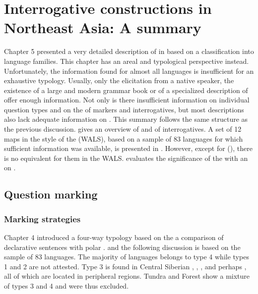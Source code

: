 \chapter{Interrogative constructions in Northeast Asia: A summary}\label{sec:6}

Chapter 5 presented a very detailed description of  in  based on a classification into language families. This chapter has an areal and typological perspective instead. Unfortunately, the information found for almost all languages is insufficient for an exhaustive typology. Usually, only the elicitation from a native speaker, the existence of a large and modern grammar book or of a specialized description of  offer enough information. Not only is there insufficient information on individual question types and on the  of markers and interrogatives, but most descriptions also lack adequate information on . This summary follows the same structure as the previous discussion.  gives an overview of  and  of interrogatives. A set of 12 maps in the style of the \textit{} (WALS), based on a sample of 83 languages for which sufficient information was available, is presented in . However, except for  (\citealt{Dryer2013k,Dryer2013m}), there is no equivalent for them in the WALS.  evaluates the significance of the  with an  on .

\section{Question marking}\label{sec:6.1}

\subsection{Marking strategies}\label{sec:6.1.1}

Chapter 4 introduced a four-way typology based on the  a comparison of declarative sentences with polar .  and the following discussion is based on the sample of 83 languages. The majority of languages belongs to type 4 while types 1 and 2 are not attested. Type 3 is found in Central Siberian , , , and perhaps , all of which are located in peripheral regions. Tundra  and Forest  show a mixture of types 3 and 4 and were thus excluded.

